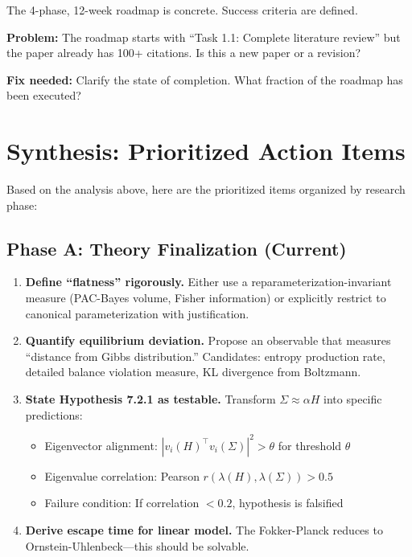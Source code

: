 \documentclass[11pt]{article}
\begin{document}
\begin{insightbox}
The 4-phase, 12-week roadmap is concrete. Success criteria are defined.
\end{insightbox}

\begin{vuongmacbox}
\textbf{Problem:} The roadmap starts with ``Task 1.1: Complete literature review'' but the paper already has 100+ citations. Is this a new paper or a revision?

\textbf{Fix needed:} Clarify the state of completion. What fraction of the roadmap has been executed?
\end{vuongmacbox}

\section{Synthesis: Prioritized Action Items}

Based on the analysis above, here are the prioritized items organized by research phase:

\subsection{Phase A: Theory Finalization (Current)}

\begin{enumerate}[label=\textbf{TF\arabic*.}]
    \item \textbf{Define ``flatness'' rigorously.} Either use a reparameterization-invariant measure (PAC-Bayes volume, Fisher information) or explicitly restrict to canonical parameterization with justification.
    
    \item \textbf{Quantify equilibrium deviation.} Propose an observable that measures ``distance from Gibbs distribution.'' Candidates: entropy production rate, detailed balance violation measure, KL divergence from Boltzmann.
    
    \item \textbf{State Hypothesis 7.2.1 as testable.} Transform $\Sigma \approx \alpha H$ into specific predictions:
    \begin{itemize}
        \item Eigenvector alignment: $|v_i(H)^\top v_i(\Sigma)|^2 > \theta$ for threshold $\theta$
        \item Eigenvalue correlation: Pearson $r(\lambda(H), \lambda(\Sigma)) > 0.5$
        \item Failure condition: If correlation $< 0.2$, hypothesis is falsified
    \end{itemize}
    
    \item \textbf{Derive escape time for linear model.} The Fokker-Planck reduces to Ornstein-Uhlenbeck---this should be solvable.
\end{enumerate}
\end{document}
